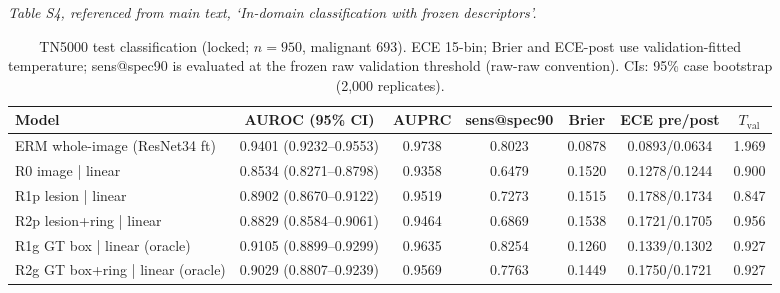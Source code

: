 \documentclass[11pt]{article}
\begin{document}
\begin{table}[!ht]
\centering\footnotesize
\caption{Phase-2 direct (parameter-free) variant, query Dice (locked). IoU for
the decoder at $K{=}20$: 0.6873 / 0.5808 / 0.5471 / 0.5598 / 0.5602 across the
five conditions in table order.}
\label{tab:phase2_direct}
\end{table}

\noindent\emph{Table S4, referenced from main text, `In-domain classification with frozen descriptors'.}

\begin{table}[!ht]
\centering\scriptsize
\setlength{\tabcolsep}{3pt}
\caption{TN5000 test classification (locked; $n{=}950$, malignant 693).
ECE 15-bin; Brier and ECE-post use validation-fitted temperature;
sens@spec90 is evaluated at the frozen raw validation threshold (raw-raw
convention). CIs: 95\% case bootstrap (2,000 replicates).}
\label{tab:phase3}
\begin{tabular}{lcccccc}
\toprule
Model & AUROC (95\% CI) & AUPRC & sens@spec90 & Brier & ECE pre/post & $T_{\mathrm{val}}$ \\
\midrule
ERM whole-image (ResNet34 ft) & 0.9401 (0.9232--0.9553) & 0.9738 & 0.8023 & 0.0878 & 0.0893/0.0634 & 1.969 \\
R0 image | linear             & 0.8534 (0.8271--0.8798) & 0.9358 & 0.6479 & 0.1520 & 0.1278/0.1244 & 0.900 \\
R1p lesion | linear           & 0.8902 (0.8670--0.9122) & 0.9519 & 0.7273 & 0.1515 & 0.1788/0.1734 & 0.847 \\
R2p lesion+ring | linear      & 0.8829 (0.8584--0.9061) & 0.9464 & 0.6869 & 0.1538 & 0.1721/0.1705 & 0.956 \\
R1g GT box | linear (oracle)  & 0.9105 (0.8899--0.9299) & 0.9635 & 0.8254 & 0.1260 & 0.1339/0.1302 & 0.927 \\
R2g GT box+ring | linear (oracle) & 0.9029 (0.8807--0.9239) & 0.9569 & 0.7763 & 0.1449 & 0.1750/0.1721 & 0.927 \\
\bottomrule
\end{tabular}
\end{table}
\end{document}
